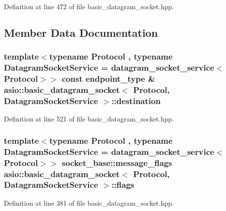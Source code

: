 Definition at line 472 of file basic\+\_\+datagram\+\_\+socket.\+hpp.



\subsection{Member Data Documentation}
\hypertarget{classasio_1_1basic__datagram__socket_a63941967078c45fcc3c315ee150070fb}{}
\subsubsection[{destination}]{\setlength{\rightskip}{0pt plus 5cm}template$<$typename Protocol , typename Datagram\+Socket\+Service  = datagram\+\_\+socket\+\_\+service$<$\+Protocol$>$$>$ const {\bf endpoint\+\_\+type} \& {\bf asio\+::basic\+\_\+datagram\+\_\+socket}$<$ Protocol, Datagram\+Socket\+Service $>$\+::destination}\label{classasio_1_1basic__datagram__socket_a63941967078c45fcc3c315ee150070fb}


Definition at line 521 of file basic\+\_\+datagram\+\_\+socket.\+hpp.

\hypertarget{classasio_1_1basic__datagram__socket_a787b917059f9c50a483196d3edaf800c}{}
\subsubsection[{flags}]{\setlength{\rightskip}{0pt plus 5cm}template$<$typename Protocol , typename Datagram\+Socket\+Service  = datagram\+\_\+socket\+\_\+service$<$\+Protocol$>$$>$ {\bf socket\+\_\+base\+::message\+\_\+flags} {\bf asio\+::basic\+\_\+datagram\+\_\+socket}$<$ Protocol, Datagram\+Socket\+Service $>$\+::flags}\label{classasio_1_1basic__datagram__socket_a787b917059f9c50a483196d3edaf800c}


Definition at line 381 of file basic\+\_\+datagram\+\_\+socket.\+hpp.

\hypertarget{classasio_1_1basic__datagram__socket_a21209afeb1d5c1e0c76f3165dcfba9de}{}
